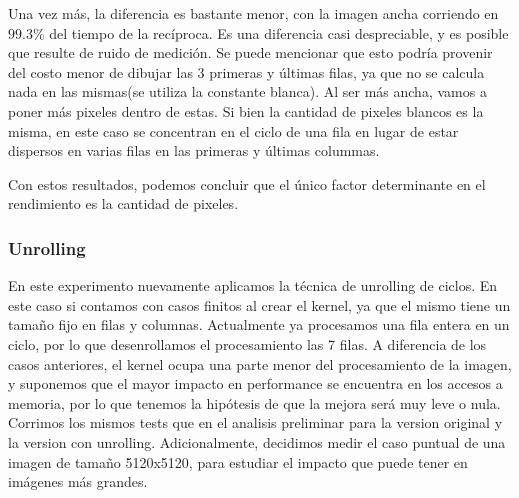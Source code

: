 Una vez más, la diferencia es bastante menor, con la imagen ancha corriendo en $99.3\%$ del tiempo de la recíproca. Es una diferencia casi despreciable, y es posible que resulte de ruido de medición. Se puede mencionar que esto podría provenir del costo menor de dibujar las 3 primeras y últimas filas, ya que no se calcula nada en las mismas(se utiliza la constante blanca). Al ser más ancha, vamos a poner más pixeles dentro de estas. Si bien la cantidad de pixeles blancos es la misma, en este caso se concentran en el ciclo de una fila en lugar de estar dispersos en varias filas en las primeras y últimas colummas.

Con estos resultados, podemos concluir que el único factor determinante en el rendimiento es la cantidad de pixeles.

\subsubsection*{Unrolling}

En este experimento nuevamente aplicamos la técnica de unrolling de ciclos. En este caso si contamos con casos finitos al crear el kernel, ya que el mismo tiene un tamaño fijo en filas y columnas. Actualmente ya procesamos una fila entera en un ciclo, por lo que desenrollamos el procesamiento las 7 filas. A diferencia de los casos anteriores, el kernel ocupa una parte menor del procesamiento de la imagen, y suponemos que el mayor impacto en performance se encuentra en los accesos a memoria, por lo que tenemos la hipótesis de que la mejora será muy leve o nula. Corrimos los mismos tests que en el analisis preliminar para la version original y la version con unrolling. Adicionalmente, decidimos medir el caso puntual de una imagen de tamaño 5120x5120, para estudiar el impacto que puede tener en imágenes más grandes.

